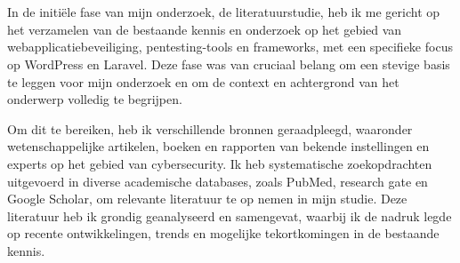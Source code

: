 
\chapter{}%
\label{ch:methodologie}

In de initiële fase van mijn onderzoek, de literatuurstudie, heb ik me gericht op het verzamelen van de bestaande 
kennis en onderzoek op het gebied van webapplicatiebeveiliging, 
pentesting-tools en frameworks, met een specifieke focus op WordPress en Laravel. Deze fase was van cruciaal 
belang om een stevige basis te leggen voor mijn onderzoek en om de context en achtergrond van het onderwerp volledig te 
begrijpen.

Om dit te bereiken, heb ik verschillende bronnen geraadpleegd, waaronder wetenschappelijke artikelen, boeken  
en rapporten van bekende instellingen en experts op het gebied van cybersecurity. 
Ik heb systematische zoekopdrachten uitgevoerd in diverse academische databases, zoals PubMed, research gate en 
Google Scholar, om relevante literatuur te op nemen in mijn studie. Deze literatuur heb ik grondig geanalyseerd en 
samengevat, waarbij ik de nadruk legde op recente ontwikkelingen, trends en mogelijke tekortkomingen in de bestaande kennis.

